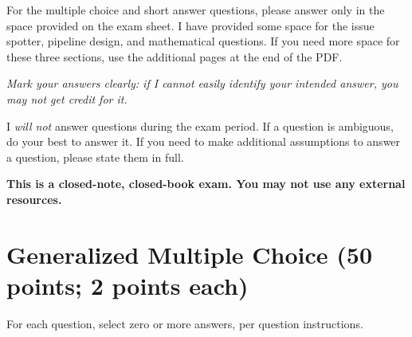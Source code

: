 \documentclass[12pt]{article}
\begin{document}
For the multiple choice and short answer questions, please answer only in the space provided on the exam sheet. I have provided some space for the issue spotter, pipeline design, and mathematical questions. If you need more space for these three sections, use the additional pages at the end of the PDF.

\emph{Mark your answers clearly: if I cannot easily identify your intended answer, you may not get credit for it.}

I \emph{will not} answer questions during the exam period. If a question is ambiguous, do your best to answer it. If you need to make additional assumptions to answer a question, please state them in full.

\begin{center}
    \bf This is a closed-note, closed-book exam. You may not use any external resources.
\end{center}

\clearpage

\section*{Generalized Multiple Choice (50 points; 2 points each)}

For each question, select zero or more answers, per question instructions. 
\end{document}
